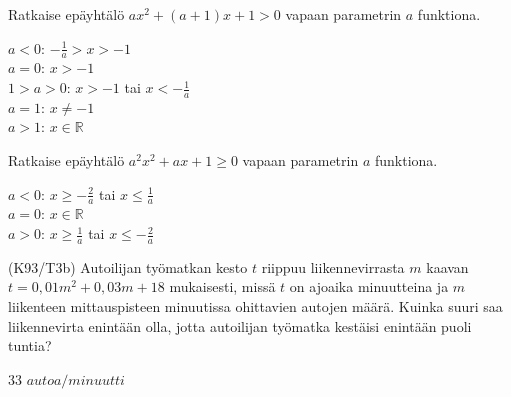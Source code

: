 \begin{tehtava}
    Ratkaise epäyhtälö $ax^2+(a+1)x+1 > 0$ vapaan parametrin $a$ funktiona.
    \begin{vastaus}
        $a < 0$: $-\frac{1}{a} > x > -1$ \\ $a = 0$: $x > -1$ \\ $1 > a > 0$: $x > -1$ tai $x < -\frac{1}{a}$ \\ $a = 1$: $x \neq -1$ \\ $a > 1$: $x \in \mathbb{R}$
    \end{vastaus}
\end{tehtava}

\begin{tehtava}
    Ratkaise epäyhtälö $a^2x^2+ax+1 \geq 0$ vapaan parametrin $a$ funktiona.
    \begin{vastaus}
        $a < 0$: $x \geq -\frac{2}{a}$ tai $x \leq \frac{1}{a}$ \\ $a = 0$: $x \in \mathbb{R} $ \\ $a > 0$: $x \geq \frac{1}{a}$ tai $x \leq -\frac{2}{a}$
    \end{vastaus}
\end{tehtava}


\begin{tehtava}
(K93/T3b) Autoilijan työmatkan kesto $t$ riippuu liikennevirrasta $m$ kaavan 
        $t=0,01m^2+0,03m+18$ mukaisesti, missä $t$ on ajoaika minuutteina ja $m$ liikenteen mittauspisteen minuutissa ohittavien autojen määrä. Kuinka suuri saa liikennevirta enintään olla, jotta autoilijan työmatka kestäisi enintään puoli tuntia?
\begin{vastaus}
        33 $autoa/minuutti$
    \end{vastaus}
\end{tehtava}
